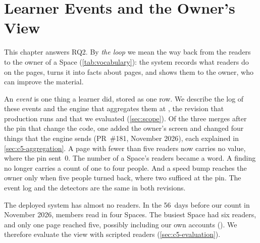 \chapter{Learner Events and the Owner's View}
\label{ch:loop}

This chapter answers RQ2. By \emph{the loop} we mean the way
back from the readers to the owner of a Space (\cref{tab:vocabulary}): the system records what
readers do on the pages, turns it into facts about pages, and shows them
to the owner, who can improve the material.

An \emph{event} is one thing a learner did, stored as one row. We describe the
log of these events and the engine that aggregates them at ,
the revision that production runs and that we evaluated (\cref{sec:scope}).
Of the three merges after the pin that change the code, one added the owner's
screen and changed four things that the engine sends (PR~\#181,
November 2026), each explained in \cref{sec:c5-aggregation}. A page with fewer than five readers now carries no value,
where the pin sent~0. The number of a Space's readers became a word. A
finding no longer carries a count of one to four people. And a speed bump
reaches the owner only when five people turned back, where two sufficed at
the pin. The event log and the detectors are the same in both revisions.

The deployed system has almost no readers. In the 56~days before our count in
November 2026, members read in four Spaces. The busiest Space had six readers,
and only one page reached five, possibly including our own accounts
().
We therefore evaluate the view with scripted readers
(\cref{sec:c5-evaluation}).

